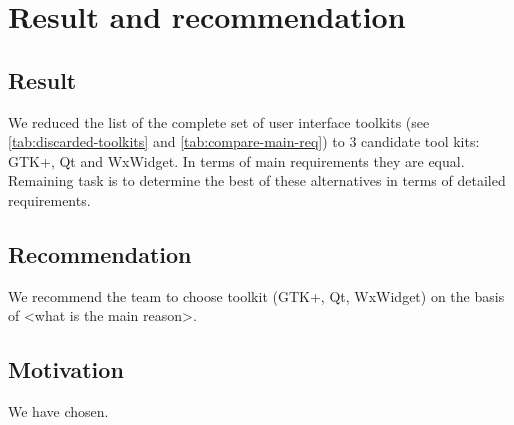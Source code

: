 \section{Result and recommendation}

\subsection{Result}

We reduced the list of the complete set of user interface toolkits (see
\ref{tab:discarded-toolkits} and \ref{tab:compare-main-req}) to 3
candidate tool kits: GTK+, Qt and WxWidget. In terms of main requirements they
are equal. Remaining task is to determine the best of these alternatives in
terms of detailed requirements. 

\subsection{Recommendation} We recommend the team to choose toolkit (GTK+, Qt,
WxWidget) on the basis of <what is the main reason>.

\subsection{Motivation}

We have chosen.
